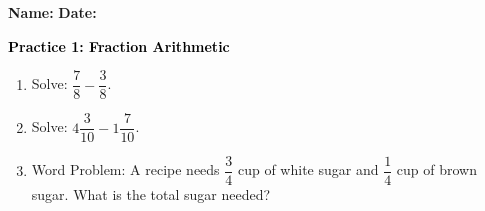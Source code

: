 \documentclass[12pt, letterpaper, fleqn]{article}
\begin{document}
\textbf{Name:} \underline{\hspace{5cm}}
\hfill
\textbf{Date:} \underline{\hspace{3cm}}\\

\begin{tcolorbox}[colback=customteal!20]
    \large\textcolor{black}{\textbf{Practice 1: Fraction Arithmetic}}
\end{tcolorbox}
\begin{enumerate}[itemsep=3.5cm, leftmargin=0.6cm]
\item Solve: $\dfrac{7}{8} - \dfrac{3}{8}$.
\vspace{3.5cm}
\item Solve: $4\dfrac{3}{10} - 1\dfrac{7}{10}$.
\vspace{3.5cm}
\item Word Problem: A recipe needs $\dfrac{3}{4}$ cup of white sugar and $\dfrac{1}{4}$ cup of brown sugar. What is the total sugar needed?
\end{enumerate}
\end{document}
